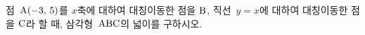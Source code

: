 점~$\mathrm{A}(-3,\,5)$를 $x$축에 대하여 대칭이동한 점을 $\mathrm{B}$, 직선~$y=x$에 대하여 대칭이동한 점을 $\mathrm{C}$라 할 때, 삼각형~$\mathrm{ABC}$의 넓이를 구하시오.
